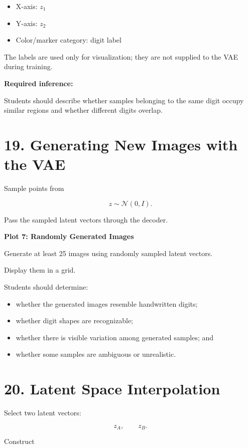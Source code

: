 \documentclass[10pt]{article}
\begin{document}
\begin{itemize}
\item X-axis: $z_1$
\item Y-axis: $z_2$
\item Color/marker category: digit label
\end{itemize}

The labels are used only for visualization; they are not supplied to the VAE
during training.

\textbf{Required inference:}

Students should describe whether samples belonging to the same digit occupy
similar regions and whether different digits overlap.

\section*{19. Generating New Images with the VAE}

Sample points from

\[
z\sim\mathcal{N}(0,I).
\]

Pass the sampled latent vectors through the decoder.

\textbf{Plot 7: Randomly Generated Images}

Generate at least 25 images using randomly sampled latent vectors.

Display them in a grid.

Students should determine:

\begin{itemize}
\item whether the generated images resemble handwritten digits;
\item whether digit shapes are recognizable;
\item whether there is visible variation among generated samples; and
\item whether some samples are ambiguous or unrealistic.
\end{itemize}

\section*{20. Latent Space Interpolation}

Select two latent vectors:

\[
z_A,\qquad z_B.
\]

Construct
\end{document}
